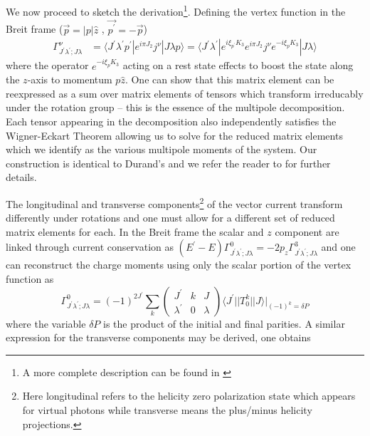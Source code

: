 We now proceed to sketch the derivation\footnote{A more complete description can be found in \cite{Durand:1962zza}}. Defining the vertex function in the Breit frame ($\vec{p} = |p|\hat{z}$ , $\vec{p^\prime} = -\vec{p}$) 
\begin{align*}
\Gamma_{J^\prime\lambda^\prime;J\lambda}^\nu &= \langle J^\prime \lambda^\prime p^\prime | e^{i \pi J_2} j^\nu | J \lambda  p\rangle = \langle J^\prime \lambda^\prime| e^{i\xi_{p^\prime} K_3} e^{i \pi J_2} j^\nu e^{-i\xi_p K_3}  | J \lambda  \rangle
\end{align*}
where the operator $e^{-i\xi_p K_3}$ acting on a rest state effects to boost the state along the $z$-axis to momentum $p\hat{z}$. One can show that this matrix element can be reexpressed as a sum over matrix elements of tensors which transform irreducably under the rotation group -- this is the essence of the multipole decomposition. Each tensor appearing in the decomposition also independently satisfies the Wigner-Eckart Theorem allowing us to solve for the reduced matrix elements which we identify as the various multipole moments of the system. Our construction is identical to Durand's and we refer the reader to \cite{Durand:1962zza} for further details. 

The longitudinal and transverse components\footnote{Here longitudinal refers to the helicity zero polarization state which appears for virtual photons while transverse means the plus/minus helicity projections.} of the vector current transform differently under rotations and one must allow for a different set of reduced matrix elements for each. In the Breit frame the scalar and $z$ component are linked through current conservation as $(E^\prime - E ) \Gamma_{J^\prime\lambda^\prime;J\lambda}^0 = -2p_z \Gamma_{J^\prime\lambda^\prime;J\lambda}^3$ and one can reconstruct the charge moments using only the scalar portion of the vertex function as
\begin{equation}
 \Gamma_{J^\prime\lambda^\prime;J\lambda}^0 = \left(-1\right)^{2J^\prime} \sum_k \begin{pmatrix} 
 J^\prime & k & J \\
 \lambda^\prime & 0 & \lambda 
 \end{pmatrix} \langle J^\prime || T^k_0 || J \rangle  \bigg|_{(-1)^k = \delta P}
\end{equation}
where the variable $\delta P$ is the product of the initial and final parities. A similar expression for the transverse components may be derived, one obtains 

